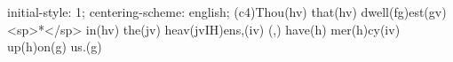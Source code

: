 initial-style: 1;
centering-scheme: english;
(c4)Thou(hv) that(hv) dwell(fg)est(gv) <sp>*</sp> in(hv) the(jv) heav(jvIH)ens,(iv) (,) have(h) mer(h)cy(iv) up(h)on(g) us.(g)
